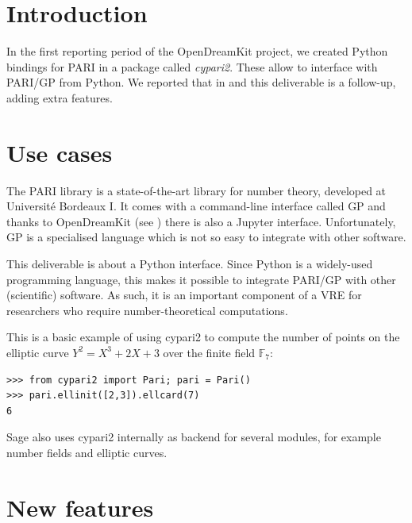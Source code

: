 \documentclass{deliverablereport}
\author{Jeroen Demeyer}
\begin{document}
\maketitle
\tableofcontents


\section{Introduction}

In the first reporting period of the OpenDreamKit project,
we created Python bindings for PARI in a package called \emph{cypari2}.
These allow to interface with PARI/GP from Python.
We reported that in  and this deliverable is a follow-up,
adding extra features.

\section{Use cases}

The PARI library is a state-of-the-art library for number theory,
developed at Universit\'e Bordeaux I.
It comes with a command-line interface called GP
and thanks to OpenDreamKit (see )
there is also a Jupyter interface.
Unfortunately, GP is a specialised language which is not so easy
to integrate with other software.

This deliverable is about a Python interface.
Since Python is a widely-used programming language,
this makes it possible to integrate PARI/GP with other (scientific) software.
As such, it is an important component of a VRE
for researchers who require number-theoretical computations.

This is a basic example of using cypari2 to compute
the number of points on the elliptic curve $Y^2 = X^3 + 2X + 3$
over the finite field $\mathbb{F}_7$:
\begin{verbatim}
>>> from cypari2 import Pari; pari = Pari()
>>> pari.ellinit([2,3]).ellcard(7)
6
\end{verbatim}

Sage also uses cypari2 internally as backend for several modules,
for example number fields and elliptic curves.

\section{New features}
\end{document}
